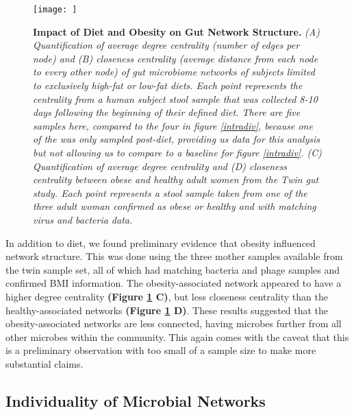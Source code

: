 \documentclass[12pt,]{article}
\begin{document}
\begin{figure}[htbp]
\centering
\texttt{[image: ]}
\caption{\textbf{Impact of Diet and Obesity on Gut Network Structure.}
\emph{(A) Quantification of average degree centrality (number of edges
per node) and (B) closeness centrality (average distance from each node
to every other node) of gut microbiome networks of subjects limited to
exclusively high-fat or low-fat diets. Each point represents the
centrality from a human subject stool sample that was collected 8-10
days following the beginning of their defined diet. There are five
samples here, compared to the four in figure \ref{intradiv}, because one
of the was only sampled post-diet, providing us data for this analysis
but not allowing us to compare to a baseline for figure \ref{intradiv}.
(C) Quantification of average degree centrality and (D) closeness
centrality between obese and healthy adult women from the Twin gut
study. Each point represents a stool sample taken from one of the three
adult woman confirmed as obese or healthy and with matching virus and
bacteria data.} \label{dietnetworks}}
\end{figure}

In addition to diet, we found preliminary evidence that obesity
influenced network structure. This was done using the three mother
samples available from the twin sample set, all of which had matching
bacteria and phage samples and confirmed BMI information. The
obesity-associated network appeared to have a higher degree centrality
\textbf{(Figure \ref{dietnetworks} C)}, but less closeness centrality
than the healthy-associated networks \textbf{(Figure \ref{dietnetworks}
D)}. These results suggested that the obesity-associated networks are
less connected, having microbes further from all other microbes within
the community. This again comes with the caveat that this is a
preliminary observation with too small of a sample size to make more
substantial claims.

\subsection{Individuality of Microbial
Networks}\label{individuality-of-microbial-networks}
\end{document}
